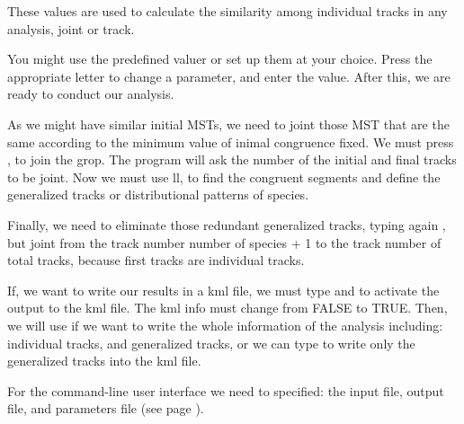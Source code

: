 These values are used to calculate the similarity among individual tracks in any analysis, joint or track.



You might use the predefined valuer or set up them at your choice. Press the appropriate letter to change a parameter, and enter the value.
After this, we are ready to conduct our analysis. 


As we might have similar initial MSTs, we need to joint those MST that are the same according to the minimum value of inimal congruence fixed. We must press , to join the grop. The program will ask the number of the initial and final tracks to be joint.  Now we must use  ll, to find the congruent segments and define the generalized tracks or distributional patterns of species. 


\vspace{-7\baselineskip}
\vspace{7\baselineskip}


Finally, we need to eliminate those redundant generalized tracks, typing again , but joint from the track number number of species + 1 to the track number of total tracks, because first tracks are individual tracks.

If, we want to write our results  in a kml file, we must type  and \tui{+} to activate the output to the  kml file. The kml info must change from FALSE to TRUE. Then, we will use  if we want to write the whole information of the analysis including: individual tracks, and generalized tracks, or we can type  to write only the generalized tracks into the kml file.


For the command-line user interface we need to specified: the input file, output file, and parameters file (see page  \pageref{commands}).



